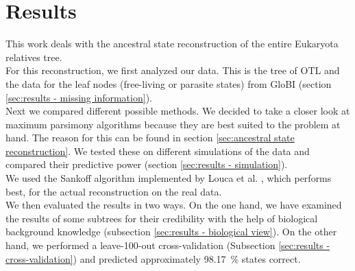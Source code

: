 \chapter{Results}
  This work deals with the ancestral state reconstruction of the entire Eukaryota relatives tree. \\

  For this reconstruction, we first analyzed our data. This is the tree of OTL \cite{Hinchliff2015}
    and the data for the leaf nodes (free-living or parasite states) from GloBI \cite{Poelen2014} 
    (section \ref{sec:results - missing information}). \\
  Next we compared different possible methods. We decided to take a closer look at maximum parsimony 
    algorithms because they are best suited to the problem at hand. The reason for this can be found 
    in section \ref{sec:ancestral state reconstruction}. We tested these on different simulations of 
    the data and compared their predictive power (section \ref{sec:results - simulation}). \\
  We used the Sankoff algorithm \cite{Sankoff1975} implemented by Louca et al. \cite{Louca2017}, 
    which performs best, for the actual reconstruction on the real data. \\

  We then evaluated the results in two ways. On the one hand, we have examined the results of some 
    subtrees for their credibility with the help of biological background knowledge (subsection 
    \ref{sec:results - biological view}). On the other hand, we performed a leave-100-out cross-validation
    (Subsection \ref{sec:results - cross-validation}) and predicted approximately 98.17~\% states 
    correct.

  
%    
